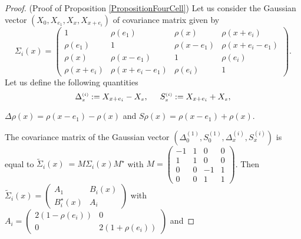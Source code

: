 \documentclass[12pt]{article}
\renewcommand{\tilde}{\widetilde}
\theoremstyle{Theorem}
\theoremstyle{definition}
\begin{document}
\begin{proof}(Proof of Proposition \ref{PropositionFourCell})
Let us consider the Gaussian vector $\left(X_{\scriptscriptstyle 0}, X_{e_1}, X_{\scriptscriptstyle x}, X_{x+e_i}\right)$ of covariance matrix given by $$\Sigma_{i}(x) = \begin{pmatrix} 1 & \rho(e_1) & \rho(x) & \rho(x+e_i)\\
\rho(e_1) & 1 & \rho(x-e_1) &  \rho(x+e_i- e_1) \\ 
\rho(x) & \rho(x-e_1) & 1 & \rho(e_i) \\
\rho(x+e_i) & \rho(x+e_i-e_1) & \rho(e_i) & 1 \end{pmatrix}.$$ 
Let us define the following quantities   \begin{equation} \label{expressions} \Delta^{\scriptscriptstyle (i)}_{\scriptscriptstyle x} := X_{x+e_i} - X_{\scriptscriptstyle x}, \hspace{0.5cm} S^{\scriptscriptstyle (i)}_{\scriptscriptstyle x} := X_{x+e_i} + X_{\scriptscriptstyle x},\end{equation}
\begin{center}
$\Delta \rho(x) = \rho(x-e_1)-\rho(x)$ and $S\rho(x)  =  \rho(x-e_1)+\rho(x)$.
\end{center}
The covariance matrix of the Gaussian vector $\left(\Delta^{\scriptscriptstyle (1)}_{\scriptscriptstyle 0}, S^{\scriptscriptstyle (1)}_{\scriptscriptstyle 0}, \Delta^{\scriptscriptstyle (i)}_{\scriptscriptstyle x}, S^{\scriptscriptstyle (i)}_{\scriptscriptstyle x}\right)$ is equal to ${\tilde{\Sigma}_{i}(x)~= M\Sigma_{i}(x) M^{\star}}$ with {\small $M = \begin{pmatrix}
-1 & 1 & 0 &  0 \\
1 & 1 & 0 &  0 \\
0& 0 & -1 &  1 \\
0 & 0 & 1 & 1
\end{pmatrix}$}. Then $\tilde{\Sigma}_{i}(x) = \begin{pmatrix} A_{1} & B_{i}(x) \\ B^{\star}_{i}(x) & A_{i} \end{pmatrix}$
with 
$A_{i} = \begin{pmatrix} 2(1-\rho(e_i)) & 0 \\ 0 & 2(1+\rho(e_i))\end{pmatrix}$ and 
\end{proof}
\end{document}
